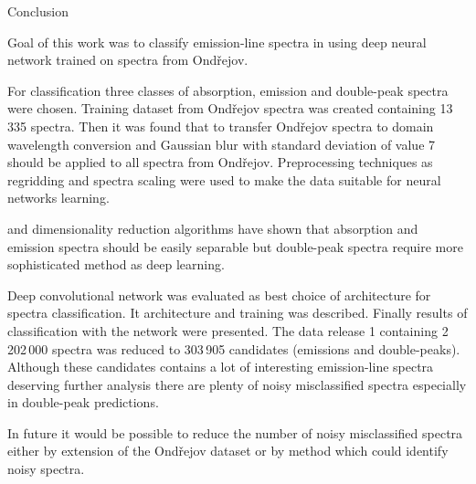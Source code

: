\chap Conclusion

Goal of this work was to classify emission-line spectra in 
using deep neural network trained on spectra from Ondřejov.

For classification three classes of absorption,
emission and double-peak spectra were chosen.
Training dataset from Ondřejov spectra was created containing 13\,335 spectra.
Then it was found that to transfer Ondřejov spectra to
 domain wavelength conversion
and Gaussian blur with standard deviation of value 7
should be applied to all spectra from Ondřejov.
Preprocessing techniques as regridding and spectra scaling were used
to make the data suitable for neural networks learning.

 and  dimensionality reduction algorithms have shown
that absorption and emission spectra should be easily separable
but double-peak spectra require more sophisticated method as deep learning.

Deep convolutional network was evaluated as best choice of architecture for
spectra classification. It architecture and training was described.
Finally results of classification with the network were presented.
The  data release 1 containing 2\,202\,000 spectra was reduced to
303\,905 candidates (emissions and double-peaks).
Although these candidates contains a lot of interesting emission-line
spectra deserving further analysis
there are plenty of noisy misclassified spectra especially in double-peak
predictions.

In future it would be possible to reduce the number of noisy misclassified
spectra either by extension of the Ondřejov dataset
or by method which could identify noisy spectra.
